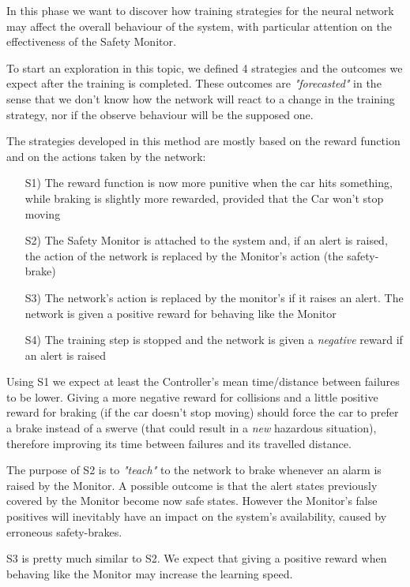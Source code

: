 In this phase we want to discover how training strategies for the neural network may affect the overall behaviour of the system, with particular attention on the effectiveness of the Safety Monitor.

To start an exploration in this topic, we defined 4 strategies and the outcomes we expect after the training is completed. These outcomes are \textsl{"forecasted"} in the sense that we don't know how the network will react to a change in the training strategy, nor if the observe behaviour will be the supposed one.

The strategies developed in this method are mostly based on the reward function and on the actions taken by the network:

\begin{itemize}
	\item[S1)] The reward function is now more punitive when the car hits something, while braking is slightly more rewarded, provided that the Car won't stop moving
	\item[S2)] The Safety Monitor is attached to the system and, if an alert is raised, the action of the network is replaced by the Monitor's action (the safety-brake)
	\item[S3)] The network's action is replaced by the monitor's if it raises an alert. The network is given a positive reward for behaving like the Monitor
	\item[S4)] The training step is stopped and the network is given a \textsl{negative} reward if an alert is raised
\end{itemize}

Using S1 we expect at least the Controller's mean time/distance between failures to be lower. Giving a more negative reward for collisions and a little positive reward for braking (if the car doesn't stop moving) should force the car to prefer a brake instead of a swerve (that could result in a \textsl{new} hazardous situation), therefore improving its time between failures and its travelled distance.

The purpose of S2 is to \textsl{"teach"} to the network to brake whenever an alarm is raised by the Monitor. A possible outcome is that the alert states previously covered by the Monitor become now safe states. However the Monitor's false positives will inevitably have an impact on the system's availability, caused by erroneous safety-brakes.

S3 is pretty much similar to S2. We expect that giving a positive reward when behaving like the Monitor may increase the learning speed.

